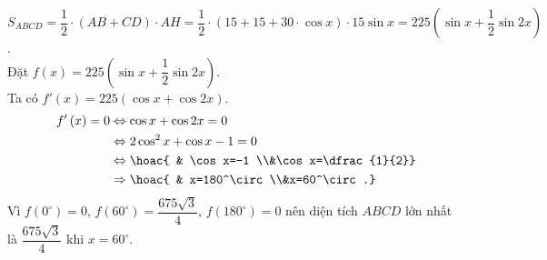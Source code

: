 \begin{bt}
{		$S_{ABCD}=\dfrac{1}{2}\cdot \left(AB+CD\right)\cdot AH=\dfrac{1}{2}\cdot \left(15+15+30\cdot \cos x\right)\cdot 15\sin x=225\left(\sin x+\dfrac{1}{2}\sin 2x\right)$.\\
		Đặt $f(x)=225\left(\sin x+\dfrac{1}{2}\sin 2x\right)$.\\
		Ta có $f'\left(x\right)=225\left(\cos x+\cos 2x\right)$.\\
		\begin{align*}
			f'\left(x\right)=0 & \Leftrightarrow \cos x+\cos 2x=0                  \\
			                   & \Leftrightarrow 2\cos^2x+\cos x-1=0               \\
			                   & \Leftrightarrow \hoac{              & \cos x=-1   \\&\cos x=\dfrac{1}{2}} \\
			                   & \Rightarrow \hoac{                  & x=180^\circ \\&x=60^\circ.}
		\end{align*}
		Vì $f\left(0^\circ\right)=0$, $f\left(60^\circ\right)=\dfrac{675\sqrt{3}}{4}$, $f\left(180^\circ\right)=0$ nên diện tích $ABCD$ lớn nhất là $\dfrac{675\sqrt{3}}{4}$ khi $x=60^\circ $.}
\end{bt}

